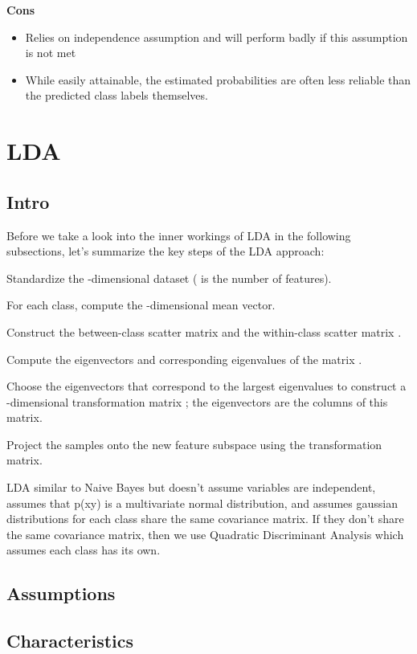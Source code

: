 \documentclass[]{book}
\theoremstyle{definition}
\theoremstyle{definition}
\theoremstyle{definition}
\theoremstyle{remark}
\begin{document}
\textbf{Cons}

\begin{itemize}
\item
  Relies on independence assumption and will perform badly if this
  assumption is not met
\item
  While easily attainable, the estimated probabilities are often less
  reliable than the predicted class labels themselves.
\end{itemize}

\section{LDA}\label{lda}

\subsection{Intro}\label{intro-1}

Before we take a look into the inner workings of LDA in the following
subsections, let's summarize the key steps of the LDA approach:

Standardize the -dimensional dataset ( is the number of features).

For each class, compute the -dimensional mean vector.

Construct the between-class scatter matrix and the within-class scatter
matrix .

Compute the eigenvectors and corresponding eigenvalues of the matrix .

Choose the eigenvectors that correspond to the largest eigenvalues to
construct a -dimensional transformation matrix ; the eigenvectors are
the columns of this matrix.

Project the samples onto the new feature subspace using the
transformation matrix.

LDA similar to Naive Bayes but doesn't assume variables are independent,
assumes that p(x\textbar{}y) is a multivariate normal distribution, and
assumes gaussian distributions for each class share the same covariance
matrix. If they don't share the same covariance matrix, then we use
Quadratic Discriminant Analysis which assumes each class has its own.

\subsection{Assumptions}\label{assumptions-1}

\subsection{Characteristics}\label{characteristics-1}
\end{document}
